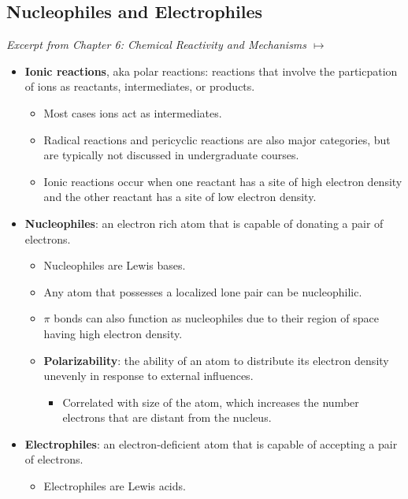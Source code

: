 \documentclass[12pt,a4paper]{article}
\begin{document}
\subsection{Nucleophiles and Electrophiles}\label{ssec:bar}
{\color{darklc}\textit{Excerpt from Chapter 6: Chemical Reactivity and Mechanisms $\mapsto$}}
\begin{itemize}
    \item \textbf{Ionic reactions}, {\color{G-Moon}aka polar reactions}: reactions that involve the particpation of ions as reactants, intermediates, or products.
        \begin{itemize}
            \item Most cases ions act as intermediates.
            \item Radical reactions and pericyclic reactions are also major categories, but are typically not discussed in undergraduate courses.
            \item Ionic reactions occur when one reactant has a site of {\color{neg}high electron density} and the other reactant has a site of {\color{pos}low electron density}.
        \end{itemize}
    \item \textbf{Nucleophiles}: an electron rich atom that is capable of donating a pair of electrons.
        \begin{itemize}
            \item {\color{neg}Nucleophiles are Lewis bases}.
            \item Any atom that possesses a localized lone pair can be nucleophilic.
            \item $\pi$ bonds can also function as nucleophiles due to their region of space having high electron density.
            \item \textbf{Polarizability}: the ability of an atom to distribute its electron density unevenly in response to external influences.
                \begin{itemize}
                    \item Correlated with size of the atom, which increases the number electrons that are distant from the nucleus.
                \end{itemize}
        \end{itemize}
    \item \textbf{Electrophiles}: an electron-deficient atom that is capable of accepting a pair of electrons.
        \begin{itemize}
            \item {\color{pos}Electrophiles are Lewis acids}.
        \end{itemize}
\end{itemize}
\end{document}
